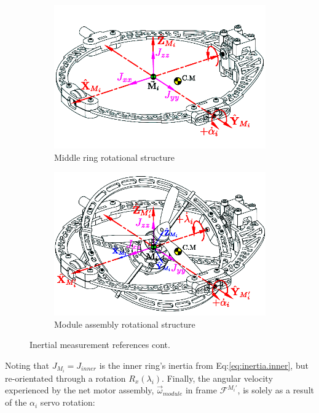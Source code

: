 \begin{figure}[htbp]
\begin{subfigure}{0.49\textwidth}
\includegraphics[width=\textwidth]{figs/inertia-middle}
\caption{Middle ring rotational structure}
\label{fig:inertia-middle}
\end{subfigure}
\begin{subfigure}{0.49\textwidth}
\includegraphics[width=\textwidth]{figs/inertia-module}
\caption{Module assembly rotational structure}
\label{fig:inertia-module}
\end{subfigure}
\caption{Inertial measurement references cont.}
\end{figure}
\par
Noting that $J_{M_i}=J_{inner}$ is the inner ring's inertia from Eq:\ref{eq:inertia.inner}, but re-orientated through a rotation $R_x(\lambda_i)$. Finally, the angular velocity experienced by the net motor assembly, $\vec{\omega}_{module}$ in frame $\mathcal{F}^{M_i'}$, is solely as a result of the $\alpha_i$ servo rotation:
